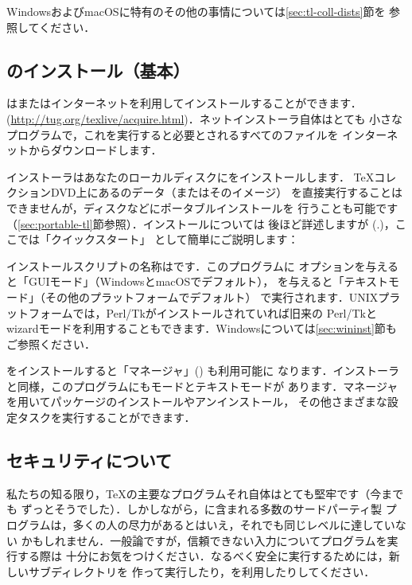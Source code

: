 \documentclass[uplatex]{jsarticle}
\begin{document}
WindowsおよびmacOSに特有のその他の事情については\ref{sec:tl-coll-dists}節を
参照してください．

\subsection{\TL のインストール（基本）}
\label{sec:basic}

\TL は\DVD またはインターネットを利用してインストールすることができます．
(\url{http://tug.org/texlive/acquire.html})．ネットインストーラ自体はとても
小さなプログラムで，これを実行すると必要とされるすべてのファイルを
インターネットからダウンロードします．

\DVD インストーラはあなたのローカルディスクに\TL をインストールします．
\TeX コレクションDVD上にある\TL のデータ（またはそのイメージ）
を直接実行することはできませんが，\USB ディスクなどにポータブルインストールを
行うことも可能です（\ref{sec:portable-tl}節参照）．インストールについては
後ほど詳述しますが (\p.\pageref{sec:install})，ここでは「クイックスタート」
として簡単にご説明します：

\begin{itemize*}
\item インストールスクリプトの名称はです．このプログラムに
オプションを与えると「GUIモード」（WindowsとmacOSでデフォルト），
を与えると「テキストモード」（その他のプラットフォームでデフォルト）
で実行されます．UNIXプラットフォームでは，Perl/Tkがインストールされていれば旧来の
Perl/Tkとwizardモードを利用することもできます．Windowsについては\ref{sec:wininst}節も
ご参照ください．

\item \TL をインストールすると「\TL マネージャ」() も利用可能に
なります．インストーラと同様，このプログラムにも\GUI モードとテキストモードが
あります．\TL マネージャを用いてパッケージのインストールやアンインストール，
その他さまざまな設定タスクを実行することができます．
\end{itemize*}

\subsection{セキュリティについて}
\label{sec:security}

私たちの知る限り，\TeX の主要なプログラムそれ自体はとても堅牢です（今までも
ずっとそうでした）．しかしながら，\TL に含まれる多数のサードパーティ製
プログラムは，多くの人の尽力があるとはいえ，それでも同じレベルに達していない
かもしれません．一般論ですが，信頼できない入力についてプログラムを実行する際は
十分にお気をつけください．なるべく安全に実行するためには，新しいサブディレクトリを
作って実行したり，を利用したりしてください．
\end{document}
